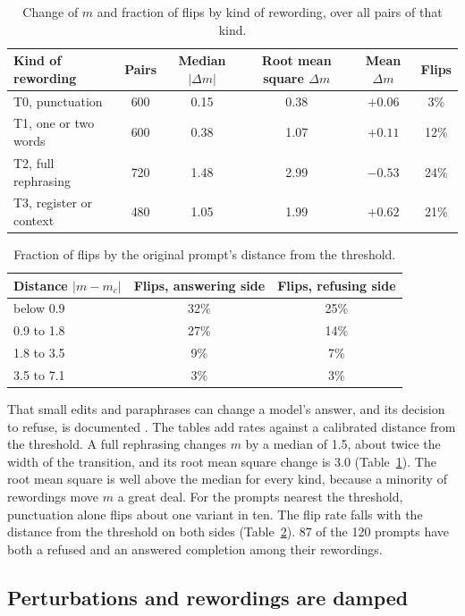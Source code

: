 \documentclass[11pt]{article}
\newcommand{\mc}{m_c}
\newcommand{\Dm}{\Delta m}
\begin{document}
\begin{table}[ht]
\centering
\caption{Change of $m$ and fraction of flips by kind of rewording, over all pairs of that kind.}
\label{tab:tiers}
\begin{tabular}{lccccc}
\toprule
Kind of rewording & Pairs & Median $|\Dm|$ & Root mean square $\Dm$ & Mean $\Dm$ & Flips \\
\midrule
T0, punctuation & 600 & 0.15 & 0.38 & $+0.06$ & 3\% \\
T1, one or two words & 600 & 0.38 & 1.07 & $+0.11$ & 12\% \\
T2, full rephrasing & 720 & 1.48 & 2.99 & $-0.53$ & 24\% \\
T3, register or context & 480 & 1.05 & 1.99 & $+0.62$ & 21\% \\
\bottomrule
\end{tabular}
\end{table}

\begin{table}[ht]
\centering
\caption{Fraction of flips by the original prompt's distance from the threshold.}
\label{tab:cells}
\begin{tabular}{lcc}
\toprule
Distance $|m-\mc|$ & Flips, answering side & Flips, refusing side \\
\midrule
below 0.9 & 32\% & 25\% \\
0.9 to 1.8 & 27\% & 14\% \\
1.8 to 3.5 & 9\% & 7\% \\
3.5 to 7.1 & 3\% & 3\% \\
\bottomrule
\end{tabular}
\end{table}

That small edits and paraphrases can change a model's answer, and its decision to refuse, is documented \cite{salinas,hughes,anonto}. The tables add rates against a calibrated distance from the threshold. A full rephrasing changes $m$ by a median of 1.5, about twice the width of the transition, and its root mean square change is 3.0 (Table~\ref{tab:tiers}). The root mean square is well above the median for every kind, because a minority of rewordings move $m$ a great deal. For the prompts nearest the threshold, punctuation alone flips about one variant in ten. The flip rate falls with the distance from the threshold on both sides (Table~\ref{tab:cells}). 87 of the 120 prompts have both a refused and an answered completion among their rewordings.

\subsection{Perturbations and rewordings are damped}
\label{sec:damped}
\end{document}
